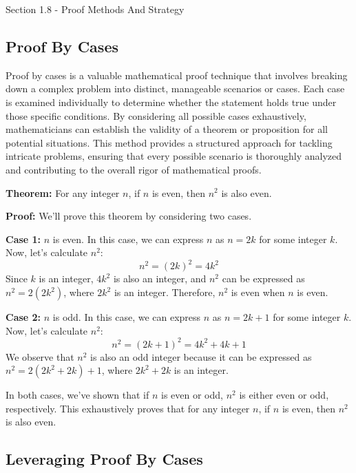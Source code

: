 \begin{notes}{Section 1.8 - Proof Methods And Strategy}
    \subsection*{Proof By Cases}

    Proof by cases is a valuable mathematical proof technique that involves breaking down a complex problem into distinct, manageable scenarios or cases. Each case is examined individually to determine 
    whether the statement holds true under those specific conditions. By considering all possible cases exhaustively, mathematicians can establish the validity of a theorem or proposition for all potential 
    situations. This method provides a structured approach for tackling intricate problems, ensuring that every possible scenario is thoroughly analyzed and contributing to the overall rigor of mathematical 
    proofs.

    \begin{highlight}
        \textbf{Theorem:} For any integer \(n\), if \(n\) is even, then \(n^2\) is also even.
    
    
        \textbf{Proof:} We'll prove this theorem by considering two cases. \vspace*{1em}
    
        \textbf{Case 1:} \(n\) is even. In this case, we can express \(n\) as \(n = 2k\) for some integer \(k\). Now, let's calculate \(n^2\):
        \[n^2 = (2k)^2 = 4k^2\]
        Since \(k\) is an integer, \(4k^2\) is also an integer, and \(n^2\) can be expressed as \(n^2 = 2(2k^2)\), where \(2k^2\) is an integer. Therefore, \(n^2\) is even when \(n\) is even.
    
        \textbf{Case 2:} \(n\) is odd. In this case, we can express \(n\) as \(n = 2k + 1\) for some integer \(k\). Now, let's calculate \(n^2\):
        \[n^2 = (2k + 1)^2 = 4k^2 + 4k + 1\]
        We observe that \(n^2\) is also an odd integer because it can be expressed as \(n^2 = 2(2k^2 + 2k) + 1\), where \(2k^2 + 2k\) is an integer.
    
    
        In both cases, we've shown that if \(n\) is even or odd, \(n^2\) is either even or odd, respectively. This exhaustively proves that for any integer \(n\), if \(n\) is even, then \(n^2\) is also even.
    \end{highlight}

    \subsection*{Leveraging Proof By Cases}


\end{notes}
